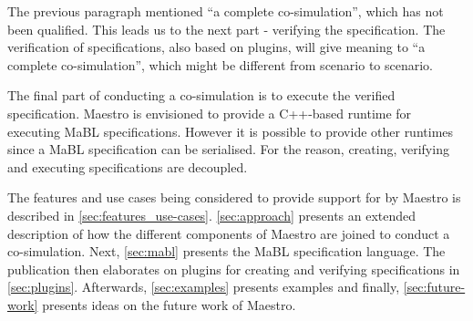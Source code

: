 The previous paragraph mentioned ``a complete co-simulation'', which has not
been qualified. This leads us to the next part - verifying the specification.
The verification of specifications, also based on plugins, will give meaning
to ``a complete co-simulation'', which might be different from scenario to scenario.

The final part of conducting a co-simulation is to execute the verified
specification. Maestro is envisioned to provide a C++-based runtime for
executing MaBL specifications. However it is possible to provide other runtimes since a MaBL specification can be
serialised. For the reason, creating, verifying and executing specifications are
decoupled.

The features and use cases being considered to provide support for by Maestro is
described in \cref{sec:features_use-cases}. \cref{sec:approach} presents an
extended description of how the different components of Maestro are joined to
conduct a co-simulation. Next, \cref{sec:mabl} presents the MaBL specification
language. The publication then elaborates on plugins for creating and verifying
specifications in \cref{sec:plugins}. Afterwards, \cref{sec:examples} presents
examples and finally, \cref{sec:future-work} presents ideas
on the future work of Maestro.


